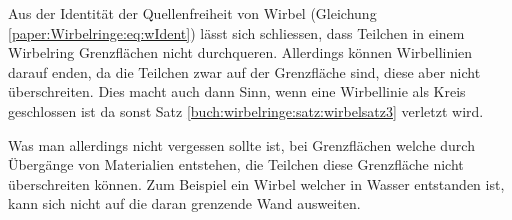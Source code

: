 Aus der Identität der Quellenfreiheit von Wirbel (Gleichung \ref{paper:Wirbelringe:eq:wIdent}) lässt sich schliessen, dass Teilchen in einem Wirbelring Grenzflächen nicht durchqueren.
Allerdings können Wirbellinien darauf enden, da die Teilchen zwar auf der Grenzfläche sind, diese aber nicht überschreiten.
Dies macht auch dann Sinn, wenn eine Wirbellinie als Kreis geschlossen ist da sonst Satz \ref{buch:wirbelringe:satz:wirbelsatz3} verletzt wird.

Was man allerdings nicht vergessen sollte ist, bei Grenzflächen welche durch Übergänge von Materialien entstehen, die Teilchen diese Grenzfläche nicht überschreiten können.
Zum Beispiel ein Wirbel welcher in Wasser entstanden ist, kann sich nicht auf die daran grenzende Wand ausweiten.
